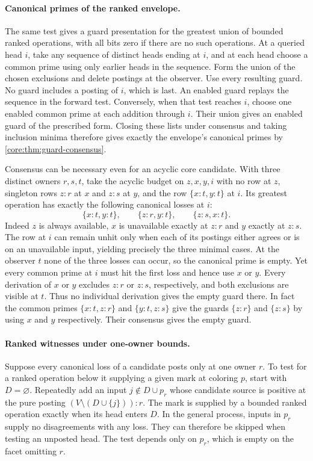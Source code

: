 \paragraph{Canonical primes of the ranked envelope.}
The same test gives a guard presentation for the greatest union
of bounded ranked operations, with all bits zero if there are no
such operations. At a queried head $i$, take any sequence of
distinct heads ending at $i$, and at each head choose a common
prime using only earlier heads in the sequence. Form the union of
the chosen exclusions and delete postings at the observer. Use
every resulting guard. No guard includes a posting of $i$, which
is last. An enabled guard replays the sequence in the forward test.
Conversely, when that test reaches $i$, choose one enabled common
prime at each addition through $i$. Their union gives an enabled
guard of the prescribed form. Closing these lists under consensus
and taking inclusion minima therefore gives exactly the envelope's
canonical primes by \cref{core:thm:guard-consensus}.

Consensus can be necessary even for an acyclic core candidate.
With three distinct owners $r,s,t$, take the acyclic budget on
$z,x,y,i$ with no row at $z$, singleton rows $z:r$ at $x$ and
$z:s$ at $y$, and the row $\{x:t,y:t\}$ at $i$.
Its greatest operation has exactly the following canonical losses
at $i$:
\[
 \{x:t,y:t\},\qquad \{z:r,y:t\},\qquad \{z:s,x:t\}.
\]
Indeed $z$ is always available, $x$ is unavailable exactly at
$z:r$ and $y$ exactly at $z:s$. The row at $i$ can remain unhit
only when each of its postings either agrees or is on an
unavailable input, yielding precisely the three minimal cases.
At the observer $t$ none of the three losses can occur, so the
canonical prime is empty. Yet every common prime at $i$ must hit
the first loss and hence use $x$ or $y$. Every derivation of $x$
or $y$ excludes $z:r$ or $z:s$, respectively, and both exclusions
are visible at $t$. Thus no individual derivation gives the
empty guard there. In fact the common primes
$\{x:t,z:r\}$ and $\{y:t,z:s\}$ give the guards
$\{z:r\}$ and $\{z:s\}$ by using $x$ and $y$ respectively.
Their consensus gives the empty guard.

\paragraph{Ranked witnesses under one-owner bounds.}
Suppose every canonical loss of a candidate posts only at one
owner $r$. To test for a ranked operation below it supplying a
given mark at coloring $p$, start with $D=\varnothing$.
Repeatedly add an input $j\notin D\cup p_r$ whose candidate
source is positive at the pure posting $(V\setminus(D\cup
\{j\})):r$. The mark is supplied by a bounded ranked operation
exactly when its head enters $D$. In the general process,
inputs in $p_r$ supply no disagreements with any loss. They
can therefore be skipped when testing an unposted head.
The test depends only on $p_r$, which is empty on the facet
omitting $r$.

